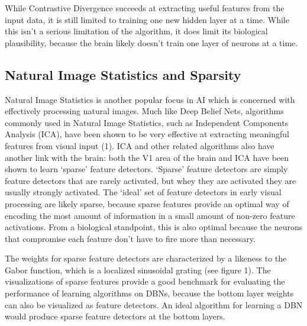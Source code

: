 \documentclass{article} %
\begin{document}
While Contrastive Divergence succeeds at extracting useful features from the input data, it is still limited to training one new hidden layer at a time. While this isn't a serious limitation of the algorithm, it does limit its biological plausibility, because the brain likely doesn't train one layer of neurons at a time. 



\subsection{Natural Image Statistics and Sparsity}

Natural Image Statistics is another popular focus in AI which is concerned with effectively processing natural images. Much like Deep Belief Nets, algorithms commonly used in Natural Image Statistics, such as Independent Components Analysis (ICA), have been shown to be very effective at extracting meaningful features from visual input (1). ICA and other related algorithms also have another link with the brain: both the V1 area of the brain and ICA have been shown to learn `sparse' feature detectors. `Sparse' feature detectors are simply feature detectors that are rarely activated, but whey they are activated they are usually strongly activated. The `ideal' set of feature detectors in early visual processing are likely sparse, because sparse features provide an optimal way of encoding the most amount of information in a small amount of non-zero feature activations. From a biological standpoint, this is also optimal because the neurons that compromise each feature don't have to fire more than necessary. 

The weights for sparse feature detectors are characterized by a likeness to the Gabor function, which is a localized sinusoidal grating (see figure 1). The visualizations of sparse features provide a good benchmark for evaluating the performance of learning algorithms on DBNs, because the bottom layer weights can also be visualized as feature detectors. An ideal algorithm for learning a DBN would produce sparse feature detectors at the bottom layers.
\end{document}
